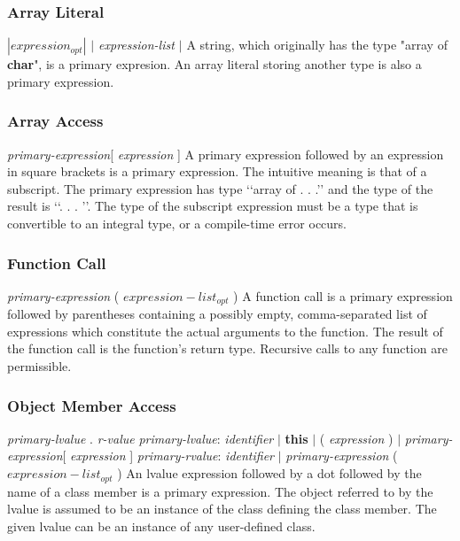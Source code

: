 \begin{homeworkProblem}
	\subsubsection{Array Literal}
	\textit{$|expression_{opt}|$ }
	\newline
	\textit{$|$ expression-list $|$ }
	\newline
	A string, which originally has the type "array of \textbf{char}", is a primary expresion. An array literal storing another type is also a primary expression.
	
	\subsubsection{Array Access}
	
	\textit{primary-expression}[ \textit{expression} ]
	\newline
	A primary expression followed by an expression in square brackets is a primary expression. The intuitive meaning is that of a subscript. The primary expression has type ‘‘array of . . .’’ and the type of the result is ‘‘. . . ’’. The type of the subscript expression must be a type that is convertible to an integral type, or a compile-time error occurs.
	
	\subsubsection{Function Call}
	\textit{primary-expression} ( \textit{$expression-list_{opt}$} )
	\newline
	A function call is a primary expression followed by parentheses containing a possibly empty, comma-separated
	list of expressions which constitute the actual arguments to the function. The result of the function call is the function's return type. Recursive calls to any function are permissible.
	
	\subsubsection{Object Member Access}
	\textit{primary-lvalue} . \textit{r-value}
	\newline
	\textit{primary-lvalue}: \textit{identifier} $|$ \textbf{this} $|$ ( \textit{expression} ) $|$ \textit{primary-expression}[ \textit{expression} ]
	\newline
	\textit{primary-rvalue}: \textit{identifier} $|$ \textit{primary-expression} ( \textit{$expression-list_{opt}$} )
	\newline
	An lvalue expression followed by a dot followed by the name of a class member is a primary expression. The object referred to by the lvalue is assumed to be an instance of the class defining the class member. The given lvalue can be an instance of any user-defined class.
	

\end{homeworkProblem}
